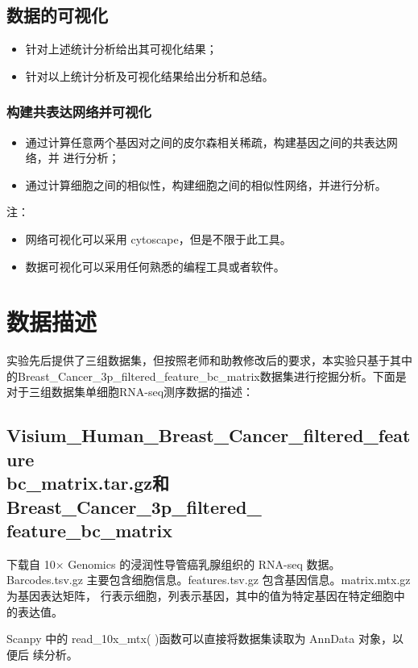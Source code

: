 \documentclass {article}
\begin{document}
	\subsection{数据的可视化}
		\begin{itemize}
			\item 针对上述统计分析给出其可视化结果；
			\item 针对以上统计分析及可视化结果给出分析和总结。
		\end{itemize}

	\subsubsection{构建共表达网络并可视化}	
		\begin{itemize}
			\item 通过计算任意两个基因对之间的皮尔森相关稀疏，构建基因之间的共表达网络，并 
			进行分析； 
			\item 通过计算细胞之间的相似性，构建细胞之间的相似性网络，并进行分析。
		\end{itemize}
	
		注：
		\begin{itemize}
			\item 网络可视化可以采用 cytoscape，但是不限于此工具。 
			\item 数据可视化可以采用任何熟悉的编程工具或者软件。
		\end{itemize}
	
\section{数据描述}
	实验先后提供了三组数据集，但按照老师和助教修改后的要求，本实验只基于其中的Breast\_Cancer\_3p\_filtered\_feature\_bc\_matrix数据集进行挖掘分析。下面是对于三组数据集单细胞RNA-seq测序数据的描述：
	\subsection{Visium\_Human\_Breast\_Cancer\_filtered\_feature\ \\ bc\_matrix.tar.gz和Breast\_Cancer\_3p\_filtered\_ \\ feature\_bc\_matrix}
		下载自 10× Genomics 的浸润性导管癌乳腺组织的 RNA-seq 数据。Barcodes.tsv.gz 
		主要包含细胞信息。features.tsv.gz 包含基因信息。matrix.mtx.gz 为基因表达矩阵， 
		行表示细胞，列表示基因，其中的值为特定基因在特定细胞中的表达值。 
		
		Scanpy 中的 read\_10x\_mtx( )函数可以直接将数据集读取为 AnnData 对象，以便后 
		续分析。 
		
\end{document}
